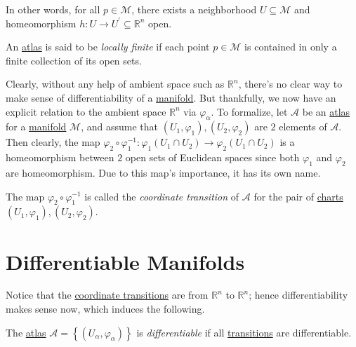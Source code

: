 In other words, for all \(p\in \mathcal{M} \), there exists a neighborhood \(U \subseteq \mathcal{M} \) and homeomorphism \(h\colon U \to U^\prime \subseteq \mathbb{R} ^n\) open.

\begin{definition}\label{def:locally-finite}
	An \hyperref[def:atlas]{atlas} is said to be \emph{locally finite} if each point \(p\in \mathcal{M} \) is contained in only a finite collection of its open sets.
\end{definition}

Clearly, without any help of ambient space such as \(\mathbb{R} ^n\), there's no clear way to make sense of differentiability of a \hyperref[def:topological-manifold]{manifold}. But thankfully, we now have an explicit relation to the ambient space \(\mathbb{R} ^n\) via \(\varphi _\alpha \). To formalize, let \(\mathcal{A} \) be an \hyperref[def:atlas]{atlas} for a \hyperref[def:topological-manifold]{manifold} \(\mathcal{M} \), and assume that \((U_1, \varphi _1), (U_2, \varphi _2)\) are \(2\) elements of \(\mathcal{A} \). Then clearly, the map \(\varphi _2 \circ \varphi _1 ^{-1} \colon \varphi _1(U_1 \cap U_2) \to \varphi _2(U_1 \cap U_2)\) is a homeomorphism between \(2\) open sets of Euclidean spaces since both \(\varphi _1\) and \(\varphi _2\) are homeomorphism. Due to this map's importance, it has its own name.

\begin{definition}\label{def:coordinate-transition}
	The map \(\varphi _2 \circ \varphi _1 ^{-1} \) is called the \emph{coordinate transition} of \(\mathcal{A} \) for the pair of \hyperref[def:coordinate-chart]{charts} \((U_1, \varphi _1), (U_2, \varphi _2)\).
\end{definition}

\begin{center}
\end{center}

\section{Differentiable Manifolds}
Notice that the \hyperref[def:coordinate-transition]{coordinate transitions} are from \(\mathbb{R} ^n\) to \(\mathbb{R} ^n\); hence differentiability makes sense now, which induces the following.

\begin{definition}\label{def:differentiable-atlas}
	The \hyperref[def:atlas]{atlas} \(\mathcal{A} = \left\{ (U_\alpha , \varphi _\alpha) \right\} \) is \emph{differentiable} if all \hyperref[def:coordinate-transition]{transitions} are differentiable.
\end{definition}

